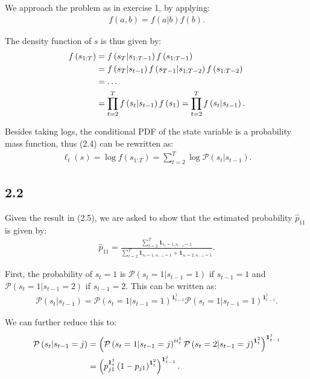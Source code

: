 \documentclass[11pt,a4paper,oneside]{article}
\newcommand{\lp}{\left(}
\newcommand{\rp}{\right)}
\newcommand{\pp}{\mathcal{P}}
\newcommand{\ii}{\mathbf{1}}
\begin{document}
We approach the problem as in exercise 1, by applying:
\begin{align}
    f\lp a, b\rp = f\lp a \vert b\rp f\lp b\rp.
\end{align}

The density function of $s$ is thus given by:
\begin{align}
    f\lp s_{1:T} \rp
        &= f\lp s_T \vert s_{1:T-1}\rp f\lp s_{1:T-1}\rp \notag \\
        &= f\lp s_T \vert s_{t-1}\rp   f\lp s_{T-1}\vert s_{1:T-2}\rp f\lp s_{1:T-2}\rp \notag \\
        &= \dots \notag \\
        &= \prod_{t = 2}^T f\lp s_t\vert s_{t-1}\rp f\lp s_1\rp =    \prod_{t = 2}^T f\lp s_t\vert s_{t-1}\rp.
\end{align}

Besides taking logs, the conditional PDF of the state variable is a probability mass function, thus (2.4) can be rewritten as:
\begin{align}
    \ell_t\lp s\rp = \log f\lp s_{1:T} \rp = \sum_{t=2}^T \log \pp\lp s_t \vert s_{t-1}\rp.
\end{align}

\subsection{2.2}
Given the result in (2.5), we are asked to show that the estimated probability $\hat p_{11}$ is given by:
\begin{align}
    \hat p_{11} = \frac{\sum_{t=2}^T \ii_{s_t = 1, s_{t-1} = 1}}{\sum_{t=2}^T \ii_{s_t = 1, s_{t-1} = 1} + \ii_{s_t = 2, s_{t-1} = 1}}.
\end{align}

First, the probability of $s_t = 1$ is $\pp\lp s_{t} = 1 \vert s_{t-1} = 1\rp$ if $s_{t-1} = 1$ and $\pp\lp s_{t} = 1 \vert s_{t-1} = 2\rp$ if $s_{t-1} = 2$. This can be written as:
\begin{align}
    \pp\lp s_t \vert s_{t-1} \rp = \pp\lp s_{t} = 1 \vert s_{t-1} = 1\rp^{\ii_{t-1}^1} \pp\lp s_{t} = 1 \vert s_{t-1} = 1\rp^{\ii_{t-1}^1}.
\end{align}

We can further reduce this to:
\begin{align}
    \pp \lp s_t \vert s_{t-1} = j\rp 
        &= \lp \pp \lp s_{t} = 1 \vert s_{t-1} = j\rp^{ii_t^1} \pp\lp s_{t} = 2 \vert s_{t-1} = j\rp^{\ii_t^2}\rp^{\ii_{t-1}^j} \notag \\
        &= \lp p_{j1}^{\ii_t^1} \lp 1 - p_{j1}\rp^{\ii_t^2}\rp^{\ii_{t-1}^j}.
\end{align}
\end{document}
